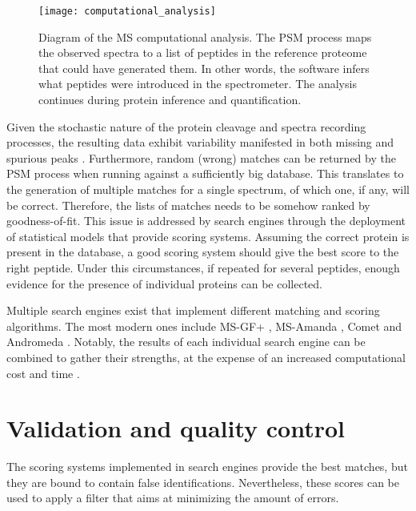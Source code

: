 \begin{figure}[!h]
\texttt{[image: computational\_analysis]}
\caption[Mass spectrometry computational analysis]{Diagram of the MS computational analysis. The PSM process maps the observed spectra to a list of peptides in the reference proteome that could have generated them. In other words, the software infers what peptides were introduced in the spectrometer. The analysis continues during protein inference and quantification.}
\label{fig:computational_analysis}
\end{figure}


Given the stochastic nature of the protein cleavage and spectra recording processes, the resulting data exhibit variability manifested in both missing and spurious peaks \cite{Stein1999}. Furthermore, random (wrong) matches can be returned by the PSM process when running against a sufficiently big database. This translates to the generation of multiple matches for a single spectrum, of which one, if any, will be correct. Therefore, the lists of matches needs to be somehow ranked by goodness-of-fit. This issue is addressed by search engines through the deployment of statistical models that provide scoring systems. Assuming the correct protein is present in the database, a good scoring system should give the best score to the right peptide. Under this circumstances, if repeated for several peptides, enough evidence for the presence of individual proteins can be collected.

Multiple search engines exist that implement different matching and scoring algorithms. The most modern ones include MS-GF+ \cite{Kim2014}, MS-Amanda \cite{Dorfer2014}, Comet \cite{Eng2013} and Andromeda \cite{Cox2011}. Notably, the results of each individual search engine can be combined to gather their strengths, at the expense of an increased computational cost and time \cite{Shteynberg2013}.



\section{Validation and quality control}
\label{sec:validation}

The scoring systems implemented in search engines provide the best matches, but they are bound to contain false identifications. Nevertheless, these scores can be used to apply a filter that aims at minimizing the amount of errors.


